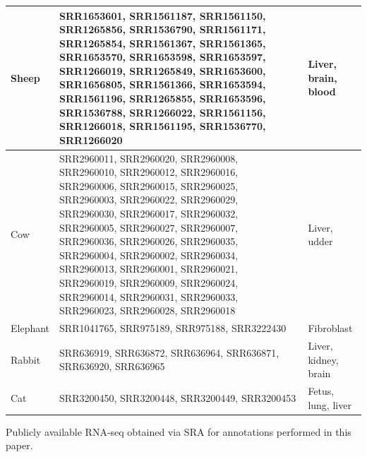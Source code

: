 \documentclass[fleqn,10pt]{wlscirep}
\begin{document}
\begin{center}
\begin{longtable}{|p{}|p{}|p{}|}
Sheep   & SRR1653601, SRR1561187, SRR1561150, SRR1265856, SRR1536790, SRR1561171, SRR1265854, SRR1561367, SRR1561365, SRR1653570, SRR1653598, SRR1653597, SRR1266019, SRR1265849, SRR1653600, SRR1656805, SRR1561366, SRR1653594, SRR1561196, SRR1265855, SRR1653596, SRR1536788, SRR1266022, SRR1561156, SRR1266018, SRR1561195, SRR1536770, SRR1266020                                                 &   Liver, brain, blood                                                          \\ \hline
Cow    & SRR2960011, SRR2960020, SRR2960008, SRR2960010, SRR2960012, SRR2960016, SRR2960006, SRR2960015, SRR2960025, SRR2960003, SRR2960022, SRR2960029, SRR2960030, SRR2960017, SRR2960032, SRR2960005, SRR2960027, SRR2960007, SRR2960036, SRR2960026, SRR2960035, SRR2960004, SRR2960002, SRR2960034, SRR2960013, SRR2960001, SRR2960021, SRR2960019, SRR2960009, SRR2960024, SRR2960014, SRR2960031, SRR2960033, SRR2960023, SRR2960028, SRR2960018 &  Liver, udder                                                          \\ \hline
Elephant & SRR1041765, SRR975189, SRR975188, SRR3222430                                                                                                                                                                                                  &    Fibroblast                                                        \\ \hline
Rabbit  & SRR636919, SRR636872, SRR636964, SRR636871, SRR636920, SRR636965                                                                                                                                                                                        &     Liver, kidney, brain                                                       \\ \hline
Cat    & SRR3200450, SRR3200448, SRR3200449, SRR3200453                                                                                                                                                                                                 &   Fetus, lung, liver                            \\ \hline              
\end{longtable}
Publicly available RNA-seq obtained via SRA for annotations performed in this paper. 
\end{center}
\end{document}
